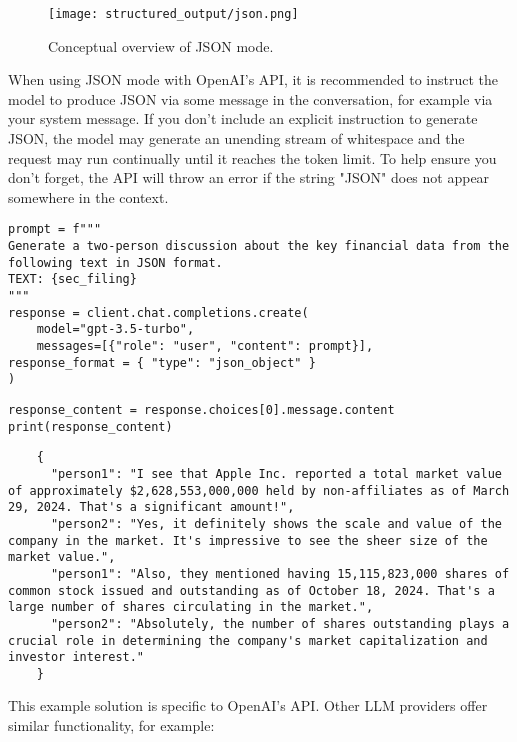 \begin{figure*}[htbp]
\centering
\texttt{[image: structured\_output/json.png]}
\caption{Conceptual overview of JSON mode.}
\label{fig:json-mode}
\end{figure*}
When using JSON mode with OpenAI's API, it is recommended to instruct the model to produce JSON via some message in the conversation, for example via your system message. If you don't include an explicit instruction to generate JSON, the model may generate an unending stream of whitespace and the request may run continually until it reaches the token limit. To help ensure you don't forget, the API will throw an error if the string "JSON" does not appear somewhere in the context.

\begin{verbatim}
prompt = f"""
Generate a two-person discussion about the key financial data from the following text in JSON format.
TEXT: {sec_filing}
"""
response = client.chat.completions.create(
    model="gpt-3.5-turbo",
    messages=[{"role": "user", "content": prompt}],
response_format = { "type": "json_object" }
)
\end{verbatim}

\begin{verbatim}
response_content = response.choices[0].message.content
print(response_content)
\end{verbatim}
    \begin{verbatim}
    {
      "person1": "I see that Apple Inc. reported a total market value of approximately $2,628,553,000,000 held by non-affiliates as of March 29, 2024. That's a significant amount!",
      "person2": "Yes, it definitely shows the scale and value of the company in the market. It's impressive to see the sheer size of the market value.",
      "person1": "Also, they mentioned having 15,115,823,000 shares of common stock issued and outstanding as of October 18, 2024. That's a large number of shares circulating in the market.",
      "person2": "Absolutely, the number of shares outstanding plays a crucial role in determining the company's market capitalization and investor interest."
    }
    \end{verbatim}

This example solution is specific to OpenAI's API. Other LLM providers offer similar functionality, for example:

